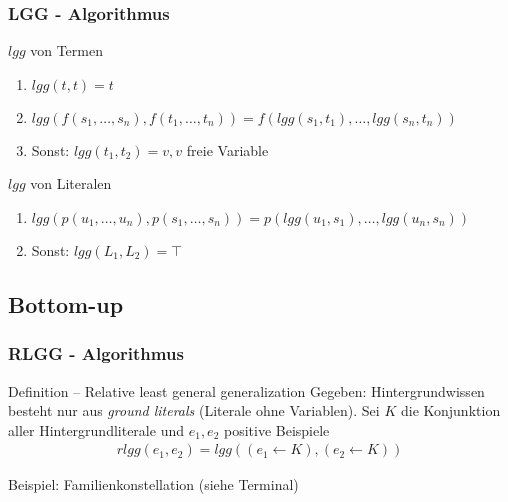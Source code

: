 \begin{frame}
\frametitle{LGG - Algorithmus}
	\begin{block}{$lgg$ von Termen}
		\begin{enumerate}
			\item $lgg(t,t) = t$\\
			\item $lgg(f(s_1, \ldots, s_n), f(t_1, \ldots, t_n)) = f(lgg(s_1, t_1), \ldots, lgg(s_n, t_n))$
			\item Sonst: $lgg(t_1, t_2) = v , v$ freie Variable
		\end{enumerate}
	\end{block}
	\begin{block}{$lgg$ von Literalen}
	\begin{enumerate}
		\item $lgg(p(u_1, \ldots, u_n), p(s_1, \ldots, s_n)) = p(lgg(u_1, s_1), \ldots, lgg(u_n, s_n))$\\
		\item Sonst: $lgg(L_1, L_2) = \top$
	\end{enumerate}
	\end{block}
\end{frame}


\subsection{Bottom-up}
\begin{frame}
\frametitle{RLGG - Algorithmus}
\begin{block}{Definition -- Relative least general generalization}
	Gegeben: Hintergrundwissen besteht nur aus \textit{ground literals} (Literale ohne Variablen).
	Sei $K$ die Konjunktion aller Hintergrundliterale und $e_1, e_2$ positive Beispiele
	\begin{align*}
		rlgg(e_1, e_2) = lgg((e_1 \leftarrow K), (e_2 \leftarrow K))
	\end{align*}
\end{block}

Beispiel: Familienkonstellation (siehe Terminal)
\end{frame}


